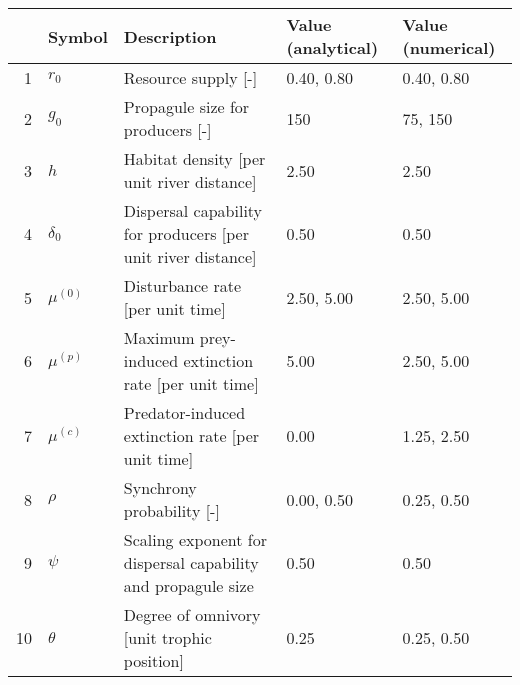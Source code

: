 \begin{table}[ht]
\centering
\begin{tabular}{rllll}
  \hline
 & Symbol & Description & Value (analytical) & Value (numerical) \\ 
  \hline
1 & $r_0$ & Resource supply [-] & 0.40, 0.80 & 0.40, 0.80 \\ 
  2 & $g_0$ & Propagule size for producers [-] & 150 & 75, 150 \\ 
  3 & $h$ & Habitat density [per unit river distance] & 2.50 & 2.50 \\ 
  4 & $\delta_0$ & Dispersal capability for producers [per unit river distance] & 0.50 & 0.50 \\ 
  5 & $\mu^{(0)}$ & Disturbance rate [per unit time] & 2.50, 5.00 & 2.50, 5.00 \\ 
  6 & $\mu^{(p)}$ & Maximum prey-induced extinction rate [per unit time] & 5.00 & 2.50, 5.00 \\ 
  7 & $\mu^{(c)}$ & Predator-induced extinction rate [per unit time] & 0.00 & 1.25, 2.50 \\ 
  8 & $\rho$ & Synchrony probability [-] & 0.00, 0.50 & 0.25, 0.50 \\ 
  9 & $\psi$ & Scaling exponent for dispersal capability and propagule size & 0.50 & 0.50 \\ 
  10 & $\theta$ & Degree of omnivory [unit trophic position] & 0.25 & 0.25, 0.50 \\ 
   \hline
\end{tabular}
\end{table}
